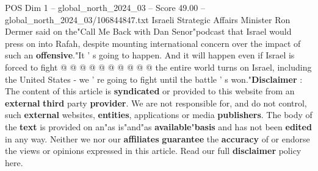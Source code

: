 \begin{textsample}{POS Dim 1 – global\_north\_2024\_03 – Score 49.00 – global\_north\_2024\_03/106844847.txt}
Israeli Strategic Affairs Minister Ron Dermer said on the"Call Me Back with Dan Senor"podcast that Israel would press on into Rafah, despite mounting international concern over the impact of such an \textbf{offensive}."It ' s going to happen.
And it will happen even if Israel is forced to fight @ @ @ @ @ @ @ @ @ @ the entire world turns on Israel, including the United States - we ' re going to fight until the battle ' s won."\textbf{Disclaimer} : The content of this article is \textbf{syndicated} or provided to this website from an \textbf{external} \textbf{third} party \textbf{provider}.
We are not responsible for, and do not control, such \textbf{external} websites, \textbf{entities}, applications or media \textbf{publishers}.
The body of the \textbf{text} is provided on an"as is"and"as \textbf{available}"\textbf{basis} and has not been \textbf{edited} in any way.
Neither we nor our \textbf{affiliates} \textbf{guarantee} the \textbf{accuracy} of or endorse the views or opinions expressed in this article.
Read our full \textbf{disclaimer} policy here.

\end{textsample}
